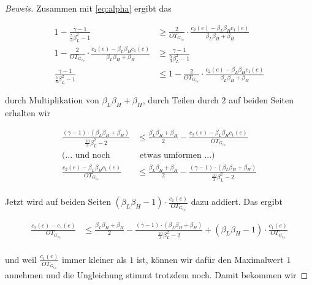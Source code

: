 \documentclass[a4paper,11pt]{scrreprt}
\begin{document}
\begin{proof}[Beweis]
Zusammen mit \ref{eq:alpha} ergibt das

\begin{align*}
1 - \frac{\gamma - 1}{\frac{5}{3}\beta_L^2 - 1} &\ge \frac{2}{OT_{G_{c_N}}} \cdot \frac{c_2(e) - \beta_L\beta_H c_1(e)}{\beta_L\beta_H + \beta_H} \\
1 - \frac{2}{OT_{G_{c_N}}} \cdot \frac{c_2(e) - \beta_L\beta_H c_1(e)}{\beta_L\beta_H + \beta_H} &\ge \frac{\gamma - 1}{\frac{5}{3}\beta_L^2 - 1} \\
\frac{\gamma - 1}{\frac{5}{3}\beta_L^2 - 1} &\le 1 - \frac{2}{OT_{G_{c_N}}} \cdot \frac{c_2(e) - \beta_L\beta_H c_1(e)}{\beta_L\beta_H + \beta_H} 
\end{align*}

durch Multiplikation von $\beta_L\beta_H + \beta_H$, durch Teilen durch $2$ auf beiden Seiten erhalten wir

\begin{align*}
\frac{(\gamma - 1)\cdot(\beta_L\beta_H + \beta_H)}{\frac{10}{3}\beta_L^2 - 2} &\le \frac{\beta_L\beta_H + \beta_H}{2} - \frac{c_2(e) - \beta_L\beta_H c_1(e)}{OT_{G_{c_N}}}\\
(\text{... und noch}&\text{ etwas umformen ...})\\
\frac{c_2(e) - \beta_L\beta_H c_1(e)}{OT_{G_{c_N}}} &\le \frac{\beta_L\beta_H + \beta_H}{2} - \frac{(\gamma - 1)\cdot(\beta_L\beta_H + \beta_H)}{\frac{10}{3}\beta_L^2 - 2}\\
\end{align*}

Jetzt wird auf beiden Seiten $(\beta_L\beta_H - 1) \cdot  \frac{c_1(e)}{OT_{G_{c_N}}}$ dazu addiert. Das ergibt

\begin{align*}
\frac{c_2(e) - c_1(e)}{OT_{G_{c_N}}} &\le \frac{\beta_L\beta_H + \beta_H}{2} - \frac{(\gamma - 1)\cdot(\beta_L\beta_H + \beta_H)}{\frac{10}{3}\beta_L^2 - 2} + (\beta_L\beta_H - 1) \cdot \frac{c_1(e)}{OT_{G_{c_N}}}\\
\end{align*}

und weil $\frac{c_1(e)}{OT_{G_{c_N}}}$ immer kleiner als $1$ ist, können wir dafür den Maximalwert $1$ annehmen und die Ungleichung stimmt trotzdem noch. Damit bekommen wir


\end{proof}
\end{document}
